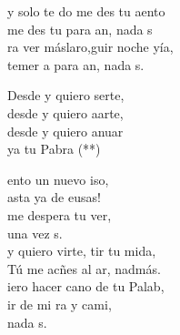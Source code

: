\begin{cancion}%
	y solo te do  me des tu aento\\
	 me des tu  para an, nada s\\
	ra ver máslaro,guir noche yía,\\
	temer a  para an, nada s.\jump\\
	\begin{chorus}%
		Desde y quiero serte,\\
		desde y quiero aarte,\\
		desde y quiero anuar\\
		ya tu Pabra (**)\jump\\
	\end{chorus}%
	ento un nuevo iso,\\
	asta ya de eusas!\\
	me despera tu ver,\\
	una vez s.\\
	\jump
	y quiero virte, tir tu mida,\\
	 Tú me acñes al ar, nadmás.\\
	iero hacer cano de tu Palab,\\
	ir de mi ra y cami,\\
	nada s.\\
\end{cancion}%
